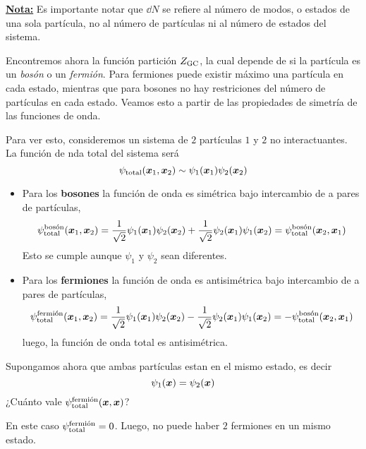 \underline{\textbf{Nota:}} Es importante notar que $\dd N$ se refiere al número de modos, o estados de una sola partícula, no al número de partículas ni al número de estados del sistema.

Encontremos ahora la función partición $\zgc$, la cual depende de si la partícula es un \textit{bosón} o un \textit{fermión}. Para fermiones puede existir máximo una partícula en cada estado, mientras que para bosones no hay restriciones del número de partículas en cada estado. Veamos esto a partir de las propiedades de simetría de las funciones de onda.

Para ver esto, consideremos un sistema de $2$ partículas $1$ y $2$ no interactuantes. La función de nda total del sistema será
\begin{equation}
  \psi_{\rm total}(\vb*{x}_1,\vb*{x}_2)\sim \psi_1(\vb*{x}_1)\psi_2(\vb*{x}_2)
\end{equation}

\begin{itemize}
	\item 
Para los \textbf{bosones} la función de onda es simétrica bajo intercambio de a pares de partículas,
\begin{equation}
  \psi_{\rm total}^{\text{bosón}}(\vb*{x}_1,\vb*{x}_2)=\frac{1}{\sqrt{2}}\psi_1(\vb*{x}_1)\psi_2(\vb*{x}_2)+\frac{1}{\sqrt{2}}\psi_2(\vb*{x}_1)\psi_1(\vb*{x}_2)=\psi_{\rm total}^{\text{bosón}}(\vb*{x}_2,\vb*{x}_1)
\end{equation}
Esto se cumple aunque $\psi_1$ y $\psi_2$ sean diferentes.

\item 
Para los \textbf{fermiones} la función de onda es antisimétrica bajo intercambio de a pares de partículas,
\begin{equation}
  \psi_{\rm total}^{\text{fermión}}(\vb*{x}_1,\vb*{x}_2)=\frac{1}{\sqrt{2}}\psi_1(\vb*{x}_1)\psi_2(\vb*{x}_2)-\frac{1}{\sqrt{2}}\psi_2(\vb*{x}_1)\psi_1(\vb*{x}_2)=-\psi_{\rm total}^{\text{bosón}}(\vb*{x}_2,\vb*{x}_1)
\end{equation}
luego, la función de onda total es antisimétrica.
\end{itemize}

Supongamos ahora que ambas partículas estan en el mismo estado, es decir
\begin{equation}
  \psi_1(\vb*{x})=\psi_2(\vec{x})
\end{equation}
¿Cuánto vale $\psi_{\rm total}^{\text{fermión}}(\vec{x},\vec{x})$?

 En este caso $\psi_{\rm total}^{\text{fermión}}=0$. Luego, no puede haber $2$ fermiones en un mismo estado.



























